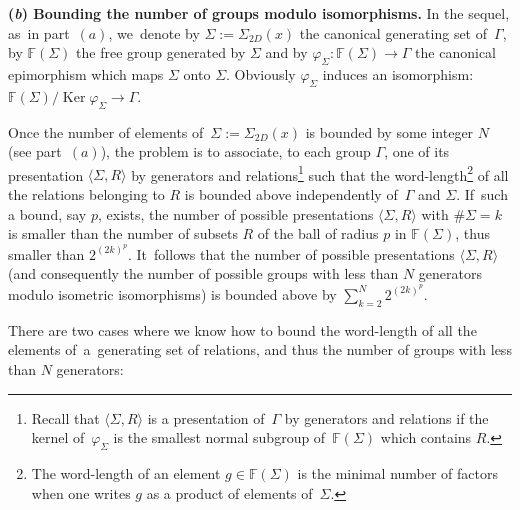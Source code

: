 \documentclass[10pt,a4paper]{amsart}
\numberwithin{equation}{section}
\newcommand{\f}{\rightarrow}
\newcommand{\Ker}{\operatorname{Ker}}
\begin{document}
\medskip\noindent
{\bf (\emph{b}) Bounding the number of groups modulo isomorphisms.}
In the sequel, as~in part~$(a)$, we~denote by $\Sigma := \Sigma_{2 D} (x) $ the canonical generating set of~$\Gamma$, by $\mathbb F (\Sigma)$
the free group generated by $\Sigma$ and by $\varphi_{\Sigma} \colon \mathbb F
(\Sigma) \f \Gamma$ the canonical epimorphism which maps $\Sigma$ onto
$\Sigma$. Obviously $\varphi_{\Sigma}$ induces an isomorphism: $ \mathbb
F (\Sigma) / {\Ker \varphi_{\Sigma}} \to \Gamma $.

Once the number of elements of~$\Sigma := \Sigma_{2 D} (x) $ is bounded
by some integer $N$ (see part~$(a)$), the problem is to associate,
to each group $\Gamma$, one of its presentation $\langle \Sigma, R \rangle$ by generators and relations\footnote{Recall that $\langle \Sigma, R \rangle$ is a presentation of~$\Gamma$ by generators and relations if the kernel of~$\varphi_{\Sigma}$ is the smallest normal subgroup of~$\mathbb F (\Sigma)$ which contains $R$.}
such that the word-length\footnote{The word-length of an element $g \in \mathbb F (\Sigma)$ is the minimal number of factors when one writes
$g$ as a product of elements of~$\Sigma$.} of all the relations belonging
to $R$ is bounded above independently of~$\Gamma$ and $\Sigma$. If~such a bound, say $p$, exists, the number of possible presentations $\langle \Sigma, R \rangle$ with $\# \Sigma = k$ is smaller than the number of subsets $R$
of the ball of radius $p$ in $\mathbb F (\Sigma)$, thus smaller than $2^{(2 k)^p}$. It~follows that the number of possible presentations $\langle \Sigma, R \rangle$ (and consequently the number of possible groups with less than $N$ generators modulo isometric isomorphisms) is bounded above by $\sum_{k = 2}^N 2^{(2k)^p}$.

There are two cases where we know how to bound the word-length of all the
elements of~a~gene\-ra\-ting set of relations, and thus the number of groups with
less than $N$ generators:
\end{document}
